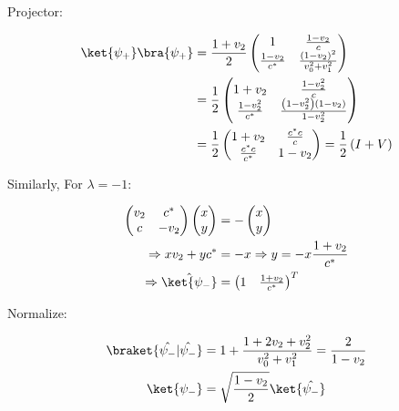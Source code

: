 \par Projector:

\begin{align}
\ket{\psi_+} \bra{\psi_+} &= \frac{1 + v_2}{2} \begin{pmatrix} 1 & \frac{1 -
v_2}{c} \\ \frac{1 - v_2}{c^*} & \frac{\left( 1 - v_2 \right)^2}{v_0^2 + v_1^2}
\end{pmatrix} \\
&= \frac{1}{2} \begin{pmatrix} 1 + v_2 & \frac{1 - v_2^2}{c} \\ \frac{1 -
v_2^2}{c^*} & \frac{\left( 1 - v_2^2 \right) \left( 1 - v_2 \right)}{1 - v_2^2}
\end{pmatrix} \\
&= \frac{1}{2} \begin{pmatrix} 1 + v_2 & \frac{c^* c}{c} \\ \frac{c^* c}{c^*} &
1 - v_2 \end{pmatrix} = \frac{1}{2} \left( I + V \right)
\end{align}

\par Similarly, For $\lambda = -1$:

\begin{align}
\begin{pmatrix} v_2 & c^* \\ c & -v_2 \end{pmatrix} \begin{pmatrix} x \\ y
\end{pmatrix} &= -\begin{pmatrix} x \\ y \end{pmatrix} \\
\Rightarrow x v_2 + y c^* &= -x \Rightarrow y = -x \frac{1 + v_2}{c^*} \\
\Rightarrow \hat{\ket{\psi_-}} &= \begin{pmatrix} 1 & \frac{1 + v_2}{c^*}
\end{pmatrix}^T
\end{align}

\par Normalize:

\begin{align}
\braket{\hat{\psi_-}|\hat{\psi_-}} &= 1 + \frac{1 + 2 v_2 + v_2^2}{v_0^2 +
v_1^2} = \frac{2}{1 - v_2} \\
\ket{\psi_-} &= \sqrt{\frac{1 - v_2}{2}} \ket{\hat{\psi_-}}
\end{align}

